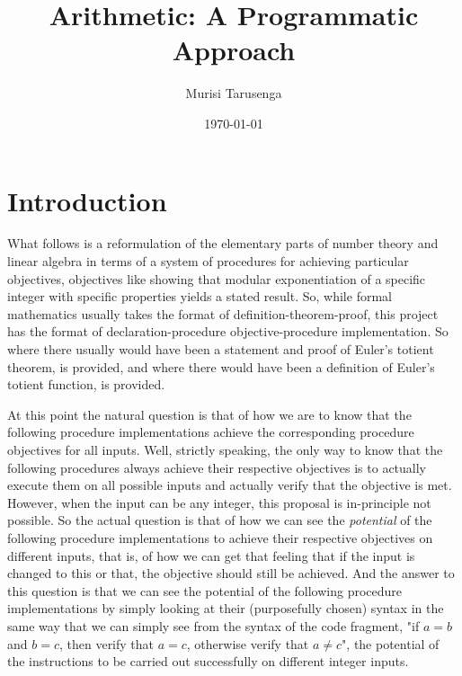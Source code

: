 \documentclass[twocolumn]{article}
\newcommand{\procedurehr}[2][]{\hyperref[sec:procedure #2]{\ifthenelse{\equal{#1}{}}{procedure #2}{#1}}}
\newcommand{\declarationhr}[2][]{\hyperref[sec:declaration #2]{\ifthenelse{\equal{#1}{}}{declaration #2}{#1}}}
\begin{document}
	\title{Arithmetic: A Programmatic Approach}
	\author{Murisi Tarusenga}
	\date{\today{} \currenttime}
	\maketitle
	\section*{Introduction}
		What follows is a reformulation of the elementary parts of number theory and linear algebra in terms of a system of procedures for achieving particular objectives, objectives like showing that modular exponentiation of a specific integer with specific properties yields a stated result. So, while formal mathematics usually takes the format of definition-theorem-proof, this project has the format of declaration-procedure objective-procedure implementation. So where there usually would have been a statement and proof of Euler's totient theorem, \procedurehr{1.50} is provided, and where there would have been a definition of Euler's totient function, \declarationhr{1.16} is provided.
		
		At this point the natural question is that of how we are to know that the following procedure implementations achieve the corresponding procedure objectives for all inputs. Well, strictly speaking, the only way to know that the following procedures always achieve their respective objectives is to actually execute them on all possible inputs and actually verify that the objective is met. However, when the input can be any integer, this proposal is in-principle not possible. So the actual question is that of how we can see the \textit{potential} of the following procedure implementations to achieve their respective objectives on different inputs, that is, of how we can get that feeling that if the input is changed to this or that, the objective should still be achieved. And the answer to this question is that we can see the potential of the following procedure implementations by simply looking at their (purposefully chosen) syntax in the same way that we can simply see from the syntax of the code fragment, "if $a=b$ and $b=c$, then verify that $a=c$, otherwise verify that $a\ne c$", the potential of the instructions to be carried out successfully on different integer inputs.
		
\end{document}
